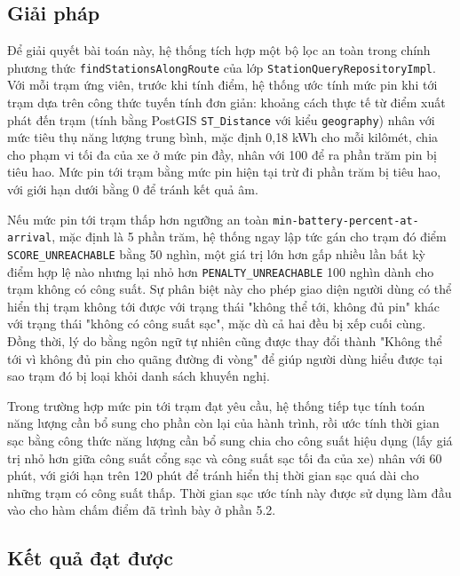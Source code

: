 \documentclass[../Main.tex]{subfiles}
\begin{document}
\subsection{Giải pháp}

Để giải quyết bài toán này, hệ thống tích hợp một bộ lọc an toàn trong chính phương thức \texttt{findStationsAlongRoute} của lớp \texttt{StationQueryRepositoryImpl}. Với mỗi trạm ứng viên, trước khi tính điểm, hệ thống ước tính mức pin khi tới trạm dựa trên công thức tuyến tính đơn giản: khoảng cách thực tế từ điểm xuất phát đến trạm (tính bằng PostGIS \texttt{ST\_Distance} với kiểu \texttt{geography}) nhân với mức tiêu thụ năng lượng trung bình, mặc định 0,18 kWh cho mỗi kilômét, chia cho phạm vi tối đa của xe ở mức pin đầy, nhân với 100 để ra phần trăm pin bị tiêu hao. Mức pin tới trạm bằng mức pin hiện tại trừ đi phần trăm bị tiêu hao, với giới hạn dưới bằng 0 để tránh kết quả âm.

Nếu mức pin tới trạm thấp hơn ngưỡng an toàn \texttt{min-battery-percent-at-arrival}, mặc định là 5 phần trăm, hệ thống ngay lập tức gán cho trạm đó điểm \texttt{SCORE\_UNREACHABLE} bằng 50 nghìn, một giá trị lớn hơn gấp nhiều lần bất kỳ điểm hợp lệ nào nhưng lại nhỏ hơn \texttt{PENALTY\_UNREACHABLE} 100 nghìn dành cho trạm không có công suất. Sự phân biệt này cho phép giao diện người dùng có thể hiển thị trạm không tới được với trạng thái "không thể tới, không đủ pin" khác với trạng thái "không có công suất sạc", mặc dù cả hai đều bị xếp cuối cùng. Đồng thời, lý do bằng ngôn ngữ tự nhiên cũng được thay đổi thành "Không thể tới vì không đủ pin cho quãng đường đi vòng" để giúp người dùng hiểu được tại sao trạm đó bị loại khỏi danh sách khuyến nghị.

Trong trường hợp mức pin tới trạm đạt yêu cầu, hệ thống tiếp tục tính toán năng lượng cần bổ sung cho phần còn lại của hành trình, rồi ước tính thời gian sạc bằng công thức năng lượng cần bổ sung chia cho công suất hiệu dụng (lấy giá trị nhỏ hơn giữa công suất cổng sạc và công suất sạc tối đa của xe) nhân với 60 phút, với giới hạn trên 120 phút để tránh hiển thị thời gian sạc quá dài cho những trạm có công suất thấp. Thời gian sạc ước tính này được sử dụng làm đầu vào cho hàm chấm điểm đã trình bày ở phần 5.2.

\subsection{Kết quả đạt được}
\end{document}

